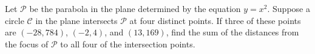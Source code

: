 Let $\mathcal{P}$ be the parabola in the plane determined by the equation $y=x^2$. Suppose a circle $\mathcal{C}$ in the plane intersects $\mathcal{P}$ at four distinct points. If three of these points are $(-28,784)$, $(-2,4)$, and $(13,169)$, find the sum of the distances from the focus of $\mathcal{P}$ to all four of the intersection points.